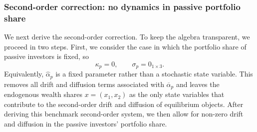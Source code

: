 


\subsubsection{Second-order correction: no dynamics in passive portfolio share}\label{app:prop_second_order}

We next derive the second-order correction.
To keep the algebra transparent, we proceed in two steps.
First, we consider the case in which the portfolio share of passive investors is fixed, so
\begin{equation}
    \kappa_p = 0, \qquad \sigma_p = 0_{1\times 3}.
\end{equation}
Equivalently, $\hat{\alpha}_p$ is a fixed parameter rather than a stochastic state variable.
This removes all drift and diffusion terms associated with $\overline{\alpha}_p$ and leaves the endogenous wealth shares $x=(x_1,x_2)$ as the only state variables that contribute to the second-order drift and diffusion of equilibrium objects.
After deriving this benchmark second-order system, we then allow for non-zero drift and diffusion in the passive investors' portfolio share.

